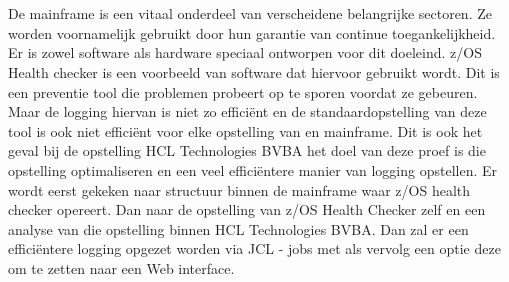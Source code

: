 
%
%

%



\chapter*{}
De mainframe is een vitaal onderdeel van verscheidene belangrijke sectoren. Ze worden voornamelijk gebruikt door hun garantie van continue toegankelijkheid. Er is zowel software als hardware speciaal ontworpen voor dit doeleind. z/OS Health checker is een voorbeeld van software dat hiervoor gebruikt wordt. Dit is een preventie tool die problemen probeert op te sporen voordat ze gebeuren. Maar de logging hiervan is niet zo efficiënt en de standaardopstelling van deze tool is ook niet efficiënt voor elke opstelling van en mainframe. Dit is ook het geval bij de opstelling HCL Technologies BVBA het doel van deze proef is die opstelling optimaliseren en een veel efficiëntere manier van logging opstellen. Er wordt eerst gekeken naar structuur binnen de mainframe waar z/OS health checker opereert. Dan naar de opstelling van z/OS Health Checker zelf en een analyse van die opstelling binnen HCL Technologies BVBA. Dan zal er een efficiëntere logging opgezet worden via JCL - jobs met als vervolg een optie deze om te zetten naar een Web interface.
